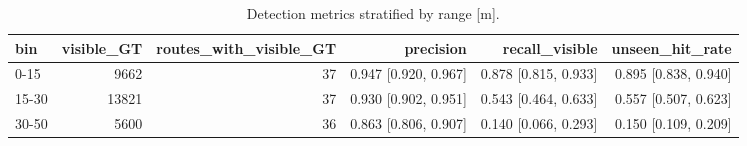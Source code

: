 \begin{table}[t]
\centering
\small
\begin{tabular}{lrrrrr}
\toprule
bin & visible\_GT & routes\_with\_visible\_GT & precision & recall\_visible & unseen\_hit\_rate \\
\midrule
0-15 & 9662 & 37 & 0.947 [0.920, 0.967] & 0.878 [0.815, 0.933] & 0.895 [0.838, 0.940] \\
15-30 & 13821 & 37 & 0.930 [0.902, 0.951] & 0.543 [0.464, 0.633] & 0.557 [0.507, 0.623] \\
30-50 & 5600 & 36 & 0.863 [0.806, 0.907] & 0.140 [0.066, 0.293] & 0.150 [0.109, 0.209] \\
\bottomrule
\end{tabular}
\caption{Detection metrics stratified by range [m].}
\label{tab:byrange}
\end{table}
